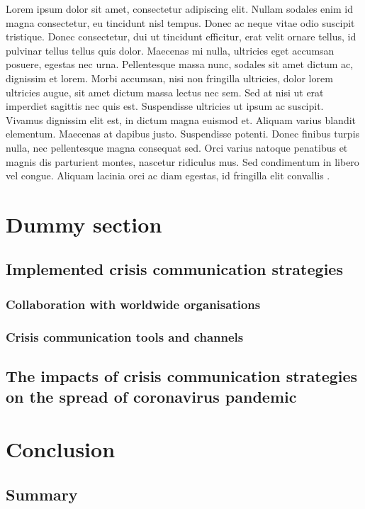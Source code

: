 \documentclass[draft=false
              ,paper=a4
              ,twoside=false
              ,fontsize=10pt
              ,headsepline
              ,BCOR10mm
              ,DIV11
              ]{article}
\begin{document}
Lorem ipsum dolor sit amet, consectetur adipiscing elit. Nullam sodales enim id magna consectetur, eu tincidunt nisl tempus. Donec ac neque vitae odio suscipit tristique. Donec consectetur, dui ut tincidunt efficitur, erat velit ornare tellus, id pulvinar tellus tellus quis dolor. Maecenas mi nulla, ultricies eget accumsan posuere, egestas nec urna. Pellentesque massa nunc, sodales sit amet dictum ac, dignissim et lorem. Morbi accumsan, nisi non fringilla ultricies, dolor lorem ultricies augue, sit amet dictum massa lectus nec sem. Sed at nisi ut erat imperdiet sagittis nec quis est. Suspendisse ultricies ut ipsum ac suscipit. Vivamus dignissim elit est, in dictum magna euismod et. Aliquam varius blandit elementum. Maecenas at dapibus justo. Suspendisse potenti. Donec finibus turpis nulla, nec pellentesque magna consequat sed. Orci varius natoque penatibus et magnis dis parturient montes, nascetur ridiculus mus. Sed condimentum in libero vel congue. Aliquam lacinia orci ac diam egestas, id fringilla elit convallis \cite{lorem}.

\section{Dummy section}
\subsection{Implemented crisis communication strategies}
\subsubsection{Collaboration with worldwide organisations}

\subsubsection{Crisis communication tools and channels}

\subsection{The impacts of crisis communication strategies on the spread of coronavirus pandemic}

\section{Conclusion}
\subsection{Summary}
\end{document}
